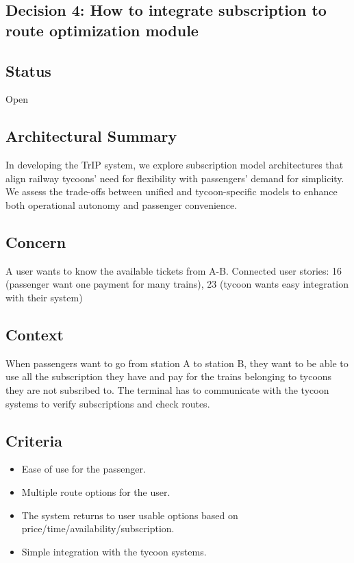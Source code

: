 \subsection{Decision 4: How to integrate subscription to route optimization module}

\subsection*{Status}
Open

\subsection*{Architectural Summary}
In developing the TrIP system, we explore subscription model architectures that align railway tycoons' need for flexibility with passengers' demand for simplicity. 
We assess the trade-offs between unified and tycoon-specific models to enhance both operational autonomy and passenger convenience.

\subsection*{Concern}
A user wants to know the available tickets from A-B. 
Connected user stories: 16 (passenger want one payment for many trains), 23 (tycoon wants easy integration with their system)

\subsection*{Context}
When passengers want to go from station A to station B, they want to be able to use all the subscription they have and pay for the trains belonging to tycoons they are not subsribed to.
The terminal has to communicate with the tycoon systems to verify subscriptions and check routes.

\subsection*{Criteria}
\begin{itemize}
\item Ease of use for the passenger.
\item Multiple route options for the user.
\item The system returns to user usable options based on price/time/availability/subscription.
\item Simple integration with the tycoon systems.
\end{itemize}

